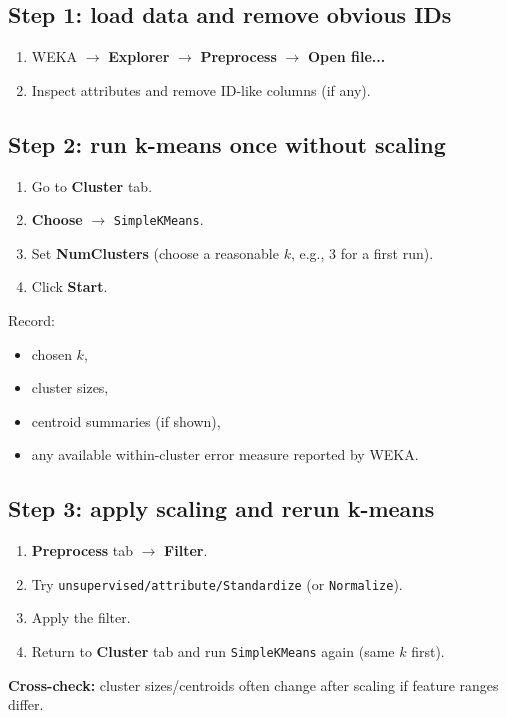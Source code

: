 \documentclass[11pt]{article}
\begin{document}
\subsection{Step 1: load data and remove obvious IDs}
\begin{enumerate}[leftmargin=*]
  \item WEKA $\rightarrow$ \textbf{Explorer} $\rightarrow$ \textbf{Preprocess} $\rightarrow$ \textbf{Open file...}
  \item Inspect attributes and remove ID-like columns (if any).
\end{enumerate}

\subsection{Step 2: run k-means once without scaling}
\begin{enumerate}[leftmargin=*]
  \item Go to \textbf{Cluster} tab.
  \item \textbf{Choose} $\rightarrow$ \texttt{SimpleKMeans}.
  \item Set \textbf{NumClusters} (choose a reasonable $k$, e.g., 3 for a first run).
  \item Click \textbf{Start}.
\end{enumerate}
Record:
\begin{itemize}[leftmargin=*]
  \item chosen $k$,
  \item cluster sizes,
  \item centroid summaries (if shown),
  \item any available within-cluster error measure reported by WEKA.
\end{itemize}

\subsection{Step 3: apply scaling and rerun k-means}
\begin{enumerate}[leftmargin=*]
  \item \textbf{Preprocess} tab $\rightarrow$ \textbf{Filter}.
  \item Try \texttt{unsupervised/attribute/Standardize} (or \texttt{Normalize}).
  \item Apply the filter.
  \item Return to \textbf{Cluster} tab and run \texttt{SimpleKMeans} again (same $k$ first).
\end{enumerate}
\textbf{Cross-check:} cluster sizes/centroids often change after scaling if feature ranges differ.
\end{document}
